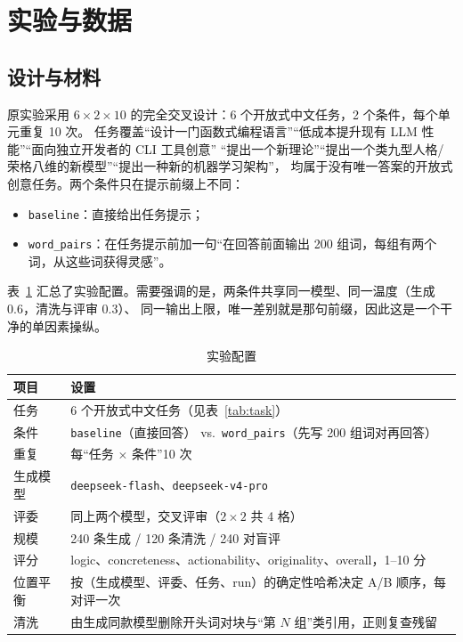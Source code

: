 \documentclass[UTF8,11pt,a4paper]{ctexart}
\newcommand{\deepflash}{\texttt{deepseek-flash}}
\newcommand{\deeppro}{\texttt{deepseek-v4-pro}}
\newcommand{\wpcond}{\texttt{word\_pairs}}
\newcommand{\basecond}{\texttt{baseline}}
\begin{document}
\section{实验与数据}

\subsection{设计与材料}

原实验采用 $6\times2\times10$ 的完全交叉设计：6 个开放式中文任务，2 个条件，每个单元重复 10 次。
任务覆盖“设计一门函数式编程语言”“低成本提升现有 LLM 性能”“面向独立开发者的 CLI 工具创意”
“提出一个新理论”“提出一个类九型人格/荣格八维的新模型”“提出一种新的机器学习架构”，
均属于没有唯一答案的开放式创意任务。两个条件只在提示前缀上不同：

\begin{itemize}
\item \basecond：直接给出任务提示；
\item \wpcond：在任务提示前加一句“在回答前面输出 200 组词，每组有两个词，从这些词获得灵感”。
\end{itemize}

表~\ref{tab:design} 汇总了实验配置。需要强调的是，两条件共享同一模型、同一温度（生成 0.6，清洗与评审 0.3）、
同一输出上限，唯一差别就是那句前缀，因此这是一个干净的单因素操纵。

\begin{table}[htbp]
\centering
\caption{实验配置}\label{tab:design}
\small
\begin{threeparttable}
\begin{tabular}{@{}ll@{}}
\toprule
项目 & 设置 \\
\midrule
任务 & 6 个开放式中文任务（见表~\ref{tab:task}） \\
条件 & \basecond（直接回答） vs.\ \wpcond（先写 200 组词对再回答） \\
重复 & 每“任务 $\times$ 条件”10 次 \\
生成模型 & \deepflash、\deeppro \\
评委 & 同上两个模型，交叉评审（$2\times2$ 共 4 格） \\
规模 & 240 条生成 / 120 条清洗 / 240 对盲评 \\
评分 & logic、concreteness、actionability、originality、overall，1--10 分 \\
位置平衡 & 按（生成模型、评委、任务、run）的确定性哈希决定 A/B 顺序，每对评一次 \\
清洗 & 由生成同款模型删除开头词对块与“第 $N$ 组”类引用，正则复查残留 \\
\bottomrule
\end{tabular}
\end{threeparttable}
\end{table}
\end{document}
